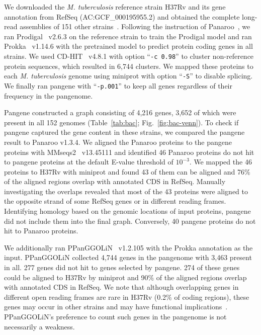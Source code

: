 \documentclass[webpdf,contemporary,large,namedate]{oup-authoring-template}%
\begin{document}
We downloaded the \emph{M. tuberculosis} reference strain H37Rv and its gene annotation from RefSeq (AC:GCF\_000195955.2)
and obtained the complete long-read assemblies of 151 other strains~\citep{Peker:2021aa,Marin:2022aa,Hall:2023aa}.
Following the instruction of Panaroo~\citep{Tonkin-Hill:2020aa},
we ran Prodigal~\citep{Hyatt:2010aa} v2.6.3 on the reference strain to train the Prodigal model
and ran Prokka~\citep{Seemann:2014aa} v1.14.6 with the pretrained model to predict protein coding genes in all strains.
We used CD-HIT~\citep{Li:2006aa,Fu:2012aa} v4.8.1 with option ``{\tt -c 0.98}'' to cluster non-reference protein sequences,
which resulted in 6,744 clusters.
We mapped these proteins to each \emph{M. tuberculosis} genome using miniprot with option ``{\tt -S}'' to disable splicing.
We finally ran pangene with ``{\tt -p.001}''
to keep all genes regardless of their frequency in the pangenome.

Pangene constructed a graph consisting of 4,216 genes,
3,652 of which were present in all 152 genomes (Table~\ref{tab:bac}; Fig.~\ref{fig:bac-venn}).
To check if pangene captured the gene content in these strains,
we compared the pangene result to Panaroo v1.3.4.
We aligned the Panaroo proteins to the pangene proteins with MMseqs2~\citep{Steinegger:2017aa} v13.45111
and identified 46 Panaroo proteins do not hit to pangene proteins at the default E-value threshold of $10^{-3}$.
We mapped the 46 proteins to H37Rv with miniprot
and found 43 of them can be aligned
and 76\% of the aligned regions overlap with annotated CDS in RefSeq.
Manually investigating the overlaps revealed that most of the 43 proteins
were aligned to the opposite strand of some RefSeq genes or in different reading frames.
Identifying homology based on the genomic locations of input proteins,
pangene did not include them into the final graph.
Conversely, 40 pangene proteins do not hit to Panaroo proteins.

We additionally ran PPanGGOLiN~\citep{Gautreau:2020aa} v1.2.105 with the Prokka annotation as the input.
PPanGGOLiN collected 4,744 genes in the pangenome with 3,463 present in all.
277 genes did not hit to genes selected by pangene.
274 of these genes could be aligned to H37Rv by miniprot
and 90\% of the aligned regions overlap with annotated CDS in RefSeq.
We note that although overlapping genes in different open reading frames are rare in H37Rv (0.2\% of coding regions),
these genes may occur in other strains and may have functional implications~\citep{Vargas:2023aa,Snobre:2024aa}.
PPanGGOLiN's preference to count such genes in the pangenome is not necessarily a weakness.
\end{document}
